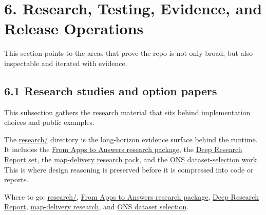 \section{6. Research, Testing, Evidence, and Release
Operations}\label{research-testing-evidence-and-release-operations}

This section points to the areas that prove the repo is not only broad,
but also inspectable and iterated with evidence.

\subsection{6.1 Research studies and option
papers}\label{research-studies-and-option-papers}

This subsection gathers the research material that sits behind
implementation choices and public examples.

The
\href{https://github.com/chris-page-gov/mcp-geo/tree/fe862910da246ca77f374cfbe484985f5df4d316/research}{research/}
directory is the long-horizon evidence surface behind the runtime. It
includes the
\href{https://github.com/chris-page-gov/mcp-geo/tree/fe862910da246ca77f374cfbe484985f5df4d316/research/From\%20Apps\%20to\%20Answers\%20-\%20Connecting\%20Public\%20Sector\%20Data\%20to\%20AI\%20with\%20MCP}{From
Apps to Answers research package}, the
\href{https://github.com/chris-page-gov/mcp-geo/tree/fe862910da246ca77f374cfbe484985f5df4d316/research/Deep\%20Research\%20Report}{Deep
Research Report set}, the
\href{https://github.com/chris-page-gov/mcp-geo/tree/fe862910da246ca77f374cfbe484985f5df4d316/research/map_delivery_research_2026-02}{map-delivery
research pack}, and the
\href{https://github.com/chris-page-gov/mcp-geo/tree/fe862910da246ca77f374cfbe484985f5df4d316/research/ons_dataset_selection}{ONS
dataset-selection work}. This is where design reasoning is preserved
before it is compressed into code or reports.

Where to go:
\href{https://github.com/chris-page-gov/mcp-geo/tree/fe862910da246ca77f374cfbe484985f5df4d316/research}{research/},
\href{https://github.com/chris-page-gov/mcp-geo/tree/fe862910da246ca77f374cfbe484985f5df4d316/research/From\%20Apps\%20to\%20Answers\%20-\%20Connecting\%20Public\%20Sector\%20Data\%20to\%20AI\%20with\%20MCP}{From
Apps to Answers research package},
\href{https://github.com/chris-page-gov/mcp-geo/tree/fe862910da246ca77f374cfbe484985f5df4d316/research/Deep\%20Research\%20Report}{Deep
Research Report},
\href{https://github.com/chris-page-gov/mcp-geo/tree/fe862910da246ca77f374cfbe484985f5df4d316/research/map_delivery_research_2026-02}{map-delivery
research}, and
\href{https://github.com/chris-page-gov/mcp-geo/tree/fe862910da246ca77f374cfbe484985f5df4d316/research/ons_dataset_selection}{ONS
dataset selection}.

